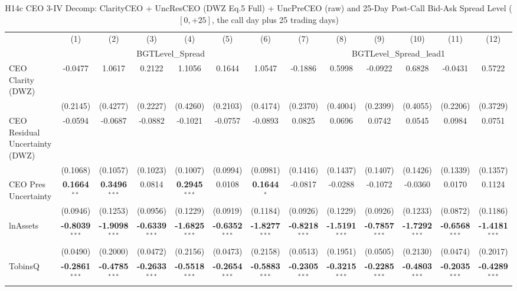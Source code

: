 \documentclass[11pt,a4paper]{article}
\begin{document}
\begin{table}[htbp]
\centering
\caption{H14c CEO 3-IV Decomp: ClarityCEO + UncResCEO (DWZ Eq.5 Full) + UncPreCEO (raw) and 25-Day Post-Call Bid-Ask Spread Level ($[0,+25]$, the call day plus 25 trading days)}
\label{tab:h14c_ceo2_decomp}
\scriptsize
\begin{tabular}{lcccccccccccc}
\toprule
 & (1) & (2) & (3) & (4) & (5) & (6) & (7) & (8) & (9) & (10) & (11) & (12) \\
 & \multicolumn{6}{c}{BGTLevel\_Spread} & \multicolumn{6}{c}{BGTLevel\_Spread\_lead1} \\
\cmidrule(lr){2-7} \cmidrule(lr){8-13}
\midrule
CEO Clarity (DWZ) & -0.0477 & 1.0617 & 0.2122 & 1.1056 & 0.1644 & 1.0547 & -0.1886 & 0.5998 & -0.0922 & 0.6828 & -0.0431 & 0.5722 \\
 & (0.2145) & (0.4277) & (0.2227) & (0.4260) & (0.2103) & (0.4174) & (0.2370) & (0.4004) & (0.2399) & (0.4055) & (0.2206) & (0.3729) \\
CEO Residual Uncertainty (DWZ) & -0.0594 & -0.0687 & -0.0882 & -0.1021 & -0.0757 & -0.0893 & 0.0825 & 0.0696 & 0.0742 & 0.0545 & 0.0984 & 0.0751 \\
 & (0.1068) & (0.1057) & (0.1023) & (0.1007) & (0.0994) & (0.0981) & (0.1416) & (0.1437) & (0.1407) & (0.1426) & (0.1339) & (0.1357) \\
CEO Pres Uncertainty & \textbf{0.1664}$^{**}$ & \textbf{0.3496}$^{***}$ & 0.0814 & \textbf{0.2945}$^{***}$ & 0.0108 & \textbf{0.1644}$^{*}$ & -0.0817 & -0.0288 & -0.1072 & -0.0360 & 0.0170 & 0.1124 \\
 & (0.0946) & (0.1253) & (0.0956) & (0.1229) & (0.0919) & (0.1184) & (0.0926) & (0.1229) & (0.0926) & (0.1233) & (0.0872) & (0.1186) \\
\midrule
lnAssets & \textbf{-0.8039}$^{***}$ & \textbf{-1.9098}$^{***}$ & \textbf{-0.6339}$^{***}$ & \textbf{-1.6825}$^{***}$ & \textbf{-0.6352}$^{***}$ & \textbf{-1.8277}$^{***}$ & \textbf{-0.8218}$^{***}$ & \textbf{-1.5191}$^{***}$ & \textbf{-0.7857}$^{***}$ & \textbf{-1.7292}$^{***}$ & \textbf{-0.6568}$^{***}$ & \textbf{-1.4181}$^{***}$ \\
 & (0.0490) & (0.2000) & (0.0472) & (0.2156) & (0.0473) & (0.2158) & (0.0513) & (0.1951) & (0.0505) & (0.2130) & (0.0474) & (0.2017) \\
TobinsQ & \textbf{-0.2861}$^{***}$ & \textbf{-0.4785}$^{***}$ & \textbf{-0.2633}$^{***}$ & \textbf{-0.5518}$^{***}$ & \textbf{-0.2654}$^{***}$ & \textbf{-0.5883}$^{***}$ & \textbf{-0.2305}$^{***}$ & \textbf{-0.3215}$^{***}$ & \textbf{-0.2285}$^{***}$ & \textbf{-0.4803}$^{***}$ & \textbf{-0.2035}$^{***}$ & \textbf{-0.4289}$^{***}$ \\

\end{tabular}
\end{table}
\end{document}
